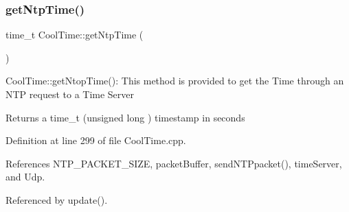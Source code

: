 \subsubsection{\texorpdfstring{get\+Ntp\+Time()}{getNtpTime()}}
{\footnotesize\ttfamily time\+\_\+t Cool\+Time\+::get\+Ntp\+Time (\begin{DoxyParamCaption}{ }\end{DoxyParamCaption})}

Cool\+Time\+::get\+Ntop\+Time()\+: This method is provided to get the Time through an N\+TP request to a Time Server

\begin{DoxyReturn}{Returns}
a time\+\_\+t (unsigned long ) timestamp in seconds 
\end{DoxyReturn}


Definition at line 299 of file Cool\+Time.\+cpp.



References N\+T\+P\+\_\+\+P\+A\+C\+K\+E\+T\+\_\+\+S\+I\+ZE, packet\+Buffer, send\+N\+T\+Ppacket(), time\+Server, and Udp.



Referenced by update().


